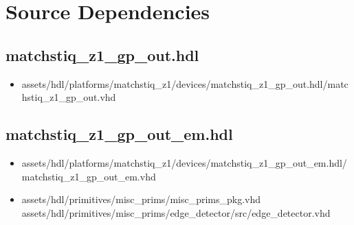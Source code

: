 \section*{Source Dependencies}
\subsection*{matchstiq\_z1\_gp\_out.hdl}
	\begin{itemize}
		\item assets/hdl/platforms/matchstiq\_z1/devices/matchstiq\_z1\_gp\_out.hdl/matchstiq\_z1\_gp\_out.vhd
	\end{itemize}

\subsection*{matchstiq\_z1\_gp\_out\_em.hdl}
	\begin{itemize}
		\item assets/hdl/platforms/matchstiq\_z1/devices/matchstiq\_z1\_gp\_out\_em.hdl/matchstiq\_z1\_gp\_out\_em.vhd
\item assets/hdl/primitives/misc\_prims/misc\_prims\_pkg.vhd
	      \subitem assets/hdl/primitives/misc\_prims/edge\_detector/src/edge\_detector.vhd
\end{itemize}


